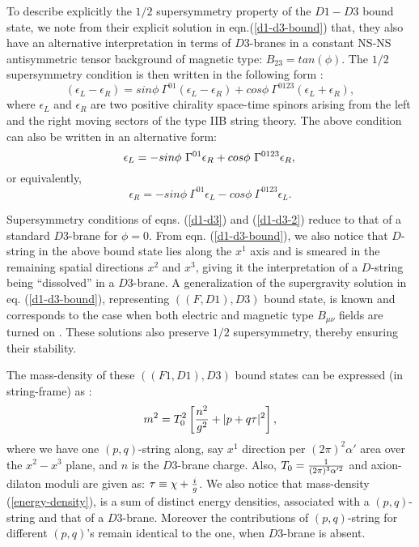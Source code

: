 \documentclass[a4paper,12pt]{article}
\begin{document}
To describe explicitly  the ${1/2}$ supersymmetry property of the 
$D1-D3$ bound state, we note from their explicit solution in 
eqn.(\ref{d1-d3-bound}) that, they also have an alternative
interpretation in terms of $D3$-branes in a constant NS-NS antisymmetric 
tensor background of magnetic type:
$B_{23}= tan(\phi)$. The ${1/2}$ supersymmetry 
condition is then written in the following form \cite{hashi}:
\begin{equation}
(\epsilon_L - \epsilon_R) = sin\phi ~\Gamma^{0 1} 
              (\epsilon_L - \epsilon_R) + 
           cos\phi ~\Gamma^{0 1 2 3} (\epsilon_L + \epsilon_R), 
\end{equation}
where $\epsilon_L$ and $\epsilon_R$ are two positive chirality 
space-time spinors arising from the left and the right moving sectors
of the type IIB string theory. The above condition can also be 
written in an alternative form:
\begin{equation}
\epsilon_L = - sin\phi ~\Gamma^{0 1} \epsilon_R 
              + cos \phi ~\Gamma^{0 1 2 3} \epsilon_R, \\
\label{d1-d3}
\end{equation}
or equivalently,
\begin{equation} 
\epsilon_R = - sin\phi ~\Gamma^{0 1} \epsilon_L 
              - cos \phi ~\Gamma^{0 1 2 3} \epsilon_L.
\label{d1-d3-2}
\end{equation}

Supersymmetry conditions of eqns. (\ref{d1-d3}) and 
(\ref{d1-d3-2}) reduce to that of a standard $D3$-brane
for $\phi= 0$. From eqn. (\ref{d1-d3-bound}), we also notice that 
$D$-string in the above bound state lies along the $x^1$ axis
and is smeared in the remaining spatial 
directions $x^2$ and $x^3$, giving it 
the interpretation of a $D$-string being ``dissolved'' in a 
$D3$-brane. A generalization of the supergravity solution in
eq. (\ref{d1-d3-bound}), representing $((F, D1),D3)$ bound state,
is known and corresponds to the case when both electric and 
magnetic type $B_{\mu \nu}$ fields are turned on 
\cite{malda-russo,jabbari}. These solutions
also preserve $1/2$ supersymmetry, thereby ensuring their
stability. 

The mass-density of these $((F1, D1), D3)$ bound states can be 
expressed (in string-frame) as \cite{myers,lu2,cai}:
\begin{equation}
m^2 = T_0^2\left[{n^2\over g^2} + |p + q \tau|^2 \right], 
\label{energy-density}
\end{equation}
where we have one $(p, q)$-string along, say $x^1$ direction
per $(2\pi)^2 \alpha'$ area \cite{lu1} over the $x^2-x^3$ plane,
and $n$ is the  $D3$-brane charge. 
Also, $T_0 = {1\over (2 \pi)^3 \alpha'^2}$ and 
axion-dilaton moduli are given as: 
$\tau \equiv \chi + {i \over g}$. We also notice that mass-density
(\ref {energy-density}), is a sum of distinct energy densities,
associated with a $(p, q)$-string and that of a $D3$-brane. Moreover
the contributions of $(p, q)$-string for different $(p, q)$'s
remain identical to the one, when $D3$-brane is absent. 
\end{document}
